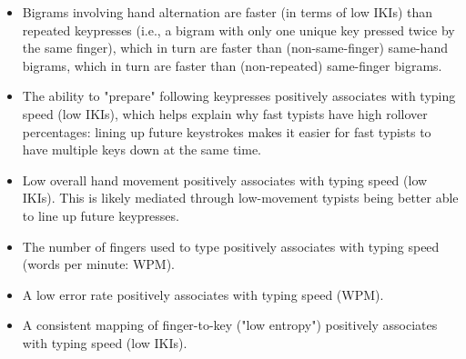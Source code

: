 \documentclass[11pt]{article}
\begin{document}
\begin{itemize}
\item Bigrams involving hand alternation are faster (in terms of low IKIs) than repeated keypresses (i.e., a bigram with only one unique key pressed twice by the same finger), which in turn are faster than (non-same-finger) same-hand bigrams, which in turn are faster than (non-repeated) same-finger bigrams.
\item The ability to "prepare" following keypresses positively associates with typing speed (low IKIs), which helps explain why fast typists have high rollover percentages: lining up future keystrokes makes it easier for fast typists to have multiple keys down at the same time.
\item Low overall hand movement positively associates with typing speed (low IKIs). This is likely mediated through low-movement typists being better able to line up future keypresses.
\item The number of fingers used to type positively associates with typing speed (words per minute: WPM).
\item A low error rate positively associates with typing speed (WPM).
\item A consistent mapping of finger-to-key ("low entropy") positively associates with typing speed (low IKIs).
\end{itemize}
\end{document}
